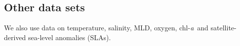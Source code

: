 \documentclass[authoryear,review,11pt]{elsarticle}
\newcommand{\chla}{chl-{\emph{a}}}
\begin{document}

\subsection{Other data sets}
\label{sec:data.misc}

We also use data on temperature, salinity, MLD, oxygen, \chla\, and satellite-derived sea-level anomalies (SLAs).
\end{document}
